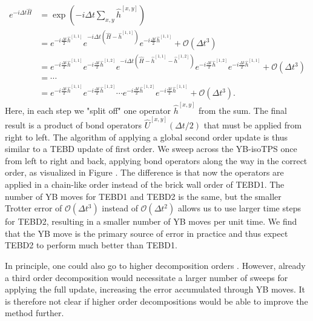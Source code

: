 \begin{equation}
	\begin{split}
		\label{eq:YB_isoTPS_tebd_second_order_suzuki_trotter_decomposition}
		e^{-i\Delta t\hat{H}} &= \exp\left(-i\Delta t\sum_{x,y}\hat{h}^{[x,y]}\right) \\
		&= e^{-i\frac{\Delta t}{2}\hat{h}^{[1, 1]}} e^{-i\Delta t\left(\hat{H}-\hat{h}^{[1,1]}\right)} e^{-i\frac{\Delta t}{2}\hat{h}^{[1, 1]}} + \mathcal{O}(\Delta t^3)\\
		&= e^{-i\frac{\Delta t}{2}\hat{h}^{[1, 1]}} e^{-i\frac{\Delta t}{2}\hat{h}^{[1, 2]}} e^{-i\Delta t\left(\hat{H}-\hat{h}^{[1,1]}-\hat{h}^{[1, 2]}\right)} e^{-i\frac{\Delta t}{2}\hat{h}^{[1, 2]}} e^{-i\frac{\Delta t}{2}\hat{h}^{[1, 1]}} + \mathcal{O}(\Delta t^3)\\
		&=\cdots\\
		&= e^{-i\frac{\Delta t}{2}\hat{h}^{[1, 1]}} e^{-i\frac{\Delta t}{2}\hat{h}^{[1, 2]}} \cdots e^{-i\frac{\Delta t}{2}\hat{h}^{[1, 2]}} e^{-i\frac{\Delta t}{2}\hat{h}^{[1, 1]}} + \mathcal{O}(\Delta t^3).
	\end{split}
\end{equation}
Here, in each step we "split off" one operator $\hat{h}^{[x,y]}$ from the sum. The final result is a product of bond operators $\hat{U}^{[x,y]}(\Delta t/2)$ that must be applied from right to left. The algorithm of applying a global second order update is thus similar to a TEBD update of first order. We sweep across the YB-isoTPS once from left to right and back, applying bond operators along the way in the correct order, as visualized in Figure . The difference is that now the operators are applied in a chain-like order instead of the brick wall order of TEBD1. The number of YB moves for TEBD1 and TEBD2 is the same, but the smaller Trotter error of $\mathcal{O}(\Delta t^3)$ instead of $\mathcal{O}(\Delta t^2)$ allows us to use larger time steps for TEBD2, resulting in a smaller number of YB moves per unit time. We find that the YB move is the primary source of error in practice and thus expect TEBD2 to perform much better than TEBD1. \par 
In principle, one could also go to higher decomposition orders \cite{cite:finding_exponential_product_formulas_of_higher_orders}. However, already a third order decomposition would necessitate a larger number of sweeps for applying the full update, increasing the error accumulated through YB moves. It is therefore not clear if higher order decompositions would be able to improve the method further.
